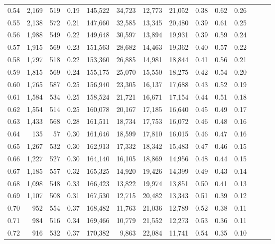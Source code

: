 \begin{tabular}{rrrrrrrrrrrrrr}
0.54 &  2,169 &  519 &  0.19 &  145,522 &   34,723 &  12,773 &  21,052 &  0.38 &  0.62 &      0.26 \\
0.55 &  2,138 &  572 &  0.21 &  147,660 &   32,585 &  13,345 &  20,480 &  0.39 &  0.61 &      0.25 \\
0.56 &  1,988 &  549 &  0.22 &  149,648 &   30,597 &  13,894 &  19,931 &  0.39 &  0.59 &      0.24 \\
0.57 &  1,915 &  569 &  0.23 &  151,563 &   28,682 &  14,463 &  19,362 &  0.40 &  0.57 &      0.22 \\
0.58 &  1,797 &  518 &  0.22 &  153,360 &   26,885 &  14,981 &  18,844 &  0.41 &  0.56 &      0.21 \\
0.59 &  1,815 &  569 &  0.24 &  155,175 &   25,070 &  15,550 &  18,275 &  0.42 &  0.54 &      0.20 \\
0.60 &  1,765 &  587 &  0.25 &  156,940 &   23,305 &  16,137 &  17,688 &  0.43 &  0.52 &      0.19 \\
0.61 &  1,584 &  534 &  0.25 &  158,524 &   21,721 &  16,671 &  17,154 &  0.44 &  0.51 &      0.18 \\
0.62 &  1,554 &  514 &  0.25 &  160,078 &   20,167 &  17,185 &  16,640 &  0.45 &  0.49 &      0.17 \\
0.63 &  1,433 &  568 &  0.28 &  161,511 &   18,734 &  17,753 &  16,072 &  0.46 &  0.48 &      0.16 \\
0.64 &    135 &   57 &  0.30 &  161,646 &   18,599 &  17,810 &  16,015 &  0.46 &  0.47 &      0.16 \\
0.65 &  1,267 &  532 &  0.30 &  162,913 &   17,332 &  18,342 &  15,483 &  0.47 &  0.46 &      0.15 \\
0.66 &  1,227 &  527 &  0.30 &  164,140 &   16,105 &  18,869 &  14,956 &  0.48 &  0.44 &      0.15 \\
0.67 &  1,185 &  557 &  0.32 &  165,325 &   14,920 &  19,426 &  14,399 &  0.49 &  0.43 &      0.14 \\
0.68 &  1,098 &  548 &  0.33 &  166,423 &   13,822 &  19,974 &  13,851 &  0.50 &  0.41 &      0.13 \\
0.69 &  1,107 &  508 &  0.31 &  167,530 &   12,715 &  20,482 &  13,343 &  0.51 &  0.39 &      0.12 \\
0.70 &    952 &  554 &  0.37 &  168,482 &   11,763 &  21,036 &  12,789 &  0.52 &  0.38 &      0.11 \\
0.71 &    984 &  516 &  0.34 &  169,466 &   10,779 &  21,552 &  12,273 &  0.53 &  0.36 &      0.11 \\
0.72 &    916 &  532 &  0.37 &  170,382 &    9,863 &  22,084 &  11,741 &  0.54 &  0.35 &      0.10 \\

\end{tabular}
